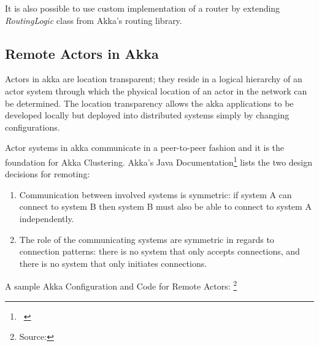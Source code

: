 It is also possible to use custom implementation of a router by extending \emph{RoutingLogic} class from Akka's routing library.

  \subsection{Remote Actors in Akka}
  Actors in akka are location transparent; they reside in a logical hierarchy of an actor system through which the physical location of an actor in the network can be determined. The location transparency allows the akka applications to be developed locally but deployed into distributed systems simply by changing configurations.~\cite{akkaJavaDoc}

  Actor systems in akka communicate in a peer-to-peer fashion and it is the foundation for Akka Clustering. Akka's Java Documentation\footnote{~} lists the two design decisions for remoting:
\begin{enumerate}

  \item Communication between involved systems is symmetric: if system A can connect to system B then system B must also be able to connect to system A independently.

  \item The role of the communicating systems are symmetric in regards to connection patterns: there is no system that only accepts connections, and there is no system that only initiates connections.

\end{enumerate}

A sample Akka Configuration and Code for Remote Actors: \footnote{Source: }

